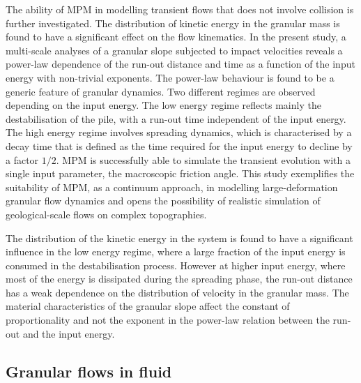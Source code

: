 The ability of MPM in modelling transient flows that does not involve collision 
is further investigated. The distribution of kinetic energy in the granular 
mass is found to have a significant effect on the flow kinematics. In the 
present study, a multi-scale analyses of a granular slope subjected to 
impact velocities reveals a power-law dependence of the run-out distance and 
time as a function of the input energy with non-trivial exponents. The 
power-law behaviour is found to be a generic feature of granular dynamics. Two 
different regimes are observed depending on the input energy. The low energy 
regime reflects mainly the destabilisation of the pile, with a run-out time 
independent of the input energy. The high energy regime involves spreading 
dynamics, which is characterised by a decay time that is defined as the time 
required for the input energy to  decline by a factor $1/2$. MPM is 
successfully able to simulate the transient evolution with a single 
input parameter, the macroscopic friction angle. This study exemplifies the 
suitability of MPM, as a continuum approach, in modelling large-deformation 
granular flow dynamics and opens the possibility of realistic simulation of 
geological-scale flows on complex topographies.


The distribution of the kinetic energy in the system is found to have a 
significant influence in the low energy regime, where a large 
fraction of the input energy is consumed in the destabilisation process. 
However at higher input energy, where most of the energy is dissipated during 
the spreading phase, the run-out distance has a weak dependence on 
the distribution of velocity in the granular mass. The material characteristics 
of the granular slope affect the constant of proportionality and not the 
exponent in the power-law relation between the run-out and the input energy. 

\subsection{Granular flows in fluid}

